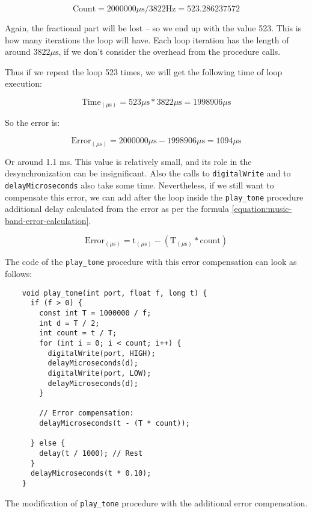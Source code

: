 \documentclass[../sparc.tex]{subfiles}
\begin{document}
\begin{equation}
  \mbox{Count} = 2000000 \mu\mbox{s} / 3822 \mbox{Hz} = 523.286237572
\end{equation}

Again, the fractional part will be lost -- so we end up with the value 523.  This
is how many iterations the loop will have.  Each loop iteration has the length
of around $3822 \mu\mbox{s}$, if we don't consider the overhead from the procedure
calls.

Thus if we repeat the loop 523 times, we will get the following time of loop
execution:

\begin{equation}
  \mbox{Time}_{(\mu\mbox{s})} = 523 \mu\mbox{s} * 3822 \mu\mbox{s} = 1998906 \mu\mbox{s}
\end{equation}

So the error is:

\begin{equation}
  \mbox{Error}_{(\mu\mbox{s})} = 2000000 \mu\mbox{s} - 1998906 \mu\mbox{s} = 1094 \mu\mbox{s}
\end{equation}

Or around 1.1 ms.  This value is relatively small, and its role in the
desynchronization can be insignificant.  Also the calls to \texttt{digitalWrite}
and to \texttt{delayMicroseconds} also take some time.  Nevertheless, if we
still want to compensate this error, we can add after the loop inside the
\texttt{play\_tone} procedure additional delay calculated from the error as per
the formula \ref{equation:music-band-error-calculation}.

\begin{equation}
  \mbox{Error}_{(\mu\mbox{s})} = \mbox{t}_{(\mu\mbox{s})} -
  (\mbox{T}_{(\mu\mbox{s})} * \mbox{count})
  \label{equation:music-band-error-calculation}
\end{equation}

The code of the \texttt{play\_tone} procedure with this error compensation can
look as follows:

\begin{listing}[!h]
  \begin{verbatim}
    void play_tone(int port, float f, long t) {
      if (f > 0) {
        const int T = 1000000 / f;
        int d = T / 2;
        int count = t / T;
        for (int i = 0; i < count; i++) {
          digitalWrite(port, HIGH);
          delayMicroseconds(d);
          digitalWrite(port, LOW);
          delayMicroseconds(d);
        }

        // Error compensation:
        delayMicroseconds(t - (T * count));

      } else {
        delay(t / 1000); // Rest
      }
      delayMicroseconds(t * 0.10);
    }
  \end{verbatim}
  \label{listing:music-band-play-tone-with-error-compensation}
  \caption{The modification of \texttt{play\_tone} procedure with the additional
    error compensation.}
\end{listing}
\end{document}
